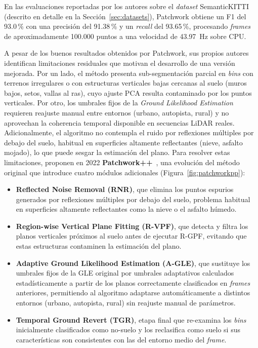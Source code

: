En las evaluaciones reportadas por los autores sobre el \textit{dataset}
SemanticKITTI~\cite{behley2019semantickitti} (descrito en detalle en
la Sección~\ref{sec:datasets}), Patchwork obtiene un F1 del 93.0\,\%
con una precisión del 91.38\,\% y un \textit{recall} del 93.65\,\%,
procesando \textit{frames} de aproximadamente 100.000 puntos a una
velocidad de 43.97~Hz sobre CPU.

A pesar de los buenos resultados obtenidos por Patchwork, sus propios
autores identifican limitaciones residuales que motivan el desarrollo
de una versión mejorada. Por un lado, el método presenta
sub-segmentación parcial en \textit{bins} con terrenos irregulares o
con estructuras verticales bajas cercanas al suelo (muros bajos, setos,
vallas al ras), cuyo ajuste PCA resulta contaminado por los puntos
verticales. Por otro, los umbrales fijos de la \textit{Ground
Likelihood Estimation} requieren reajuste manual entre entornos
(urbano, autopista, rural) y no aprovechan la coherencia temporal
disponible en secuencias LiDAR reales. Adicionalmente, el algoritmo no
contempla el ruido por reflexiones múltiples por debajo del suelo,
habitual en superficies altamente reflectantes (nieve, asfalto mojado),
lo que puede sesgar la estimación del plano. Para resolver estas
limitaciones, proponen en 2022 \textbf{Patchwork++}~\cite{lee2022patchworkpp},
una evolución del método original que introduce cuatro módulos
adicionales (Figura~\ref{fig:patchworkpp}):

\begin{itemize}
    \item \textbf{Reflected Noise Removal (RNR)}, que elimina los
    puntos espurios generados por reflexiones múltiples por debajo del
    suelo, problema habitual en superficies altamente reflectantes como
    la nieve o el asfalto húmedo.
    \item \textbf{Region-wise Vertical Plane Fitting (R-VPF)}, que
    detecta y filtra los planos verticales próximos al suelo antes de
    ejecutar R-GPF, evitando que estas estructuras contaminen la
    estimación del plano.
    \item \textbf{Adaptive Ground Likelihood Estimation (A-GLE)}, que
    sustituye los umbrales fijos de la GLE original por umbrales
    adaptativos calculados estadísticamente a partir de los planos
    correctamente clasificados en \textit{frames} anteriores,
    permitiendo al algoritmo adaptarse automáticamente a distintos
    entornos (urbano, autopista, rural) sin reajuste manual de
    parámetros.
    \item \textbf{Temporal Ground Revert (TGR)}, etapa final que
    re-examina los \textit{bins} inicialmente clasificados como no-suelo
    y los reclasifica como suelo si sus características son consistentes
    con las del entorno medio del \textit{frame}.
\end{itemize}

